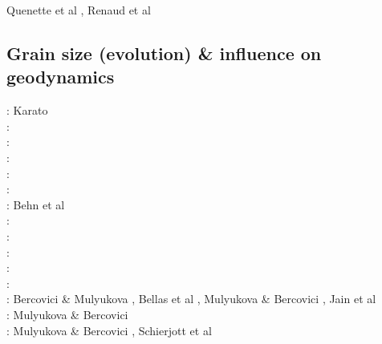 \begin{scriptsize}
Quenette et al \cite{quxm15}, Renaud et al \cite{revf19}
\end{scriptsize}

\subsection{Grain size (evolution) \& influence on geodynamics}
\label{sec:topics:gsev}

\begin{scriptsize}
\nineteeneightyfour: Karato \cite{kara84}\\
\nineteeneightynine: \cite{brcp99}\\
\twothousandone: \cite{dets01}\cite{solo01}\\
\twothousandtwo: \cite{soet02}\\
\twothousandthree: \cite{hapa03}\cite{reyu03}\\
\twothousandeight: \cite{sore08}\\
\twothousandnine: Behn et al \cite{behe09}\\
\twothousandeleven: \cite{rorb11}\\
\twothousandthirteen: \cite{beri13}\\
\twothousandfourteen: \cite{besr14}\\
\twothousandfifteen: \cite{thrk15}\cite{tukb15}\cite{pevp15}\cite{glfa15}\\
\twothousandseventeen: \cite{ceww17}\cite{daef17}\cite{mube17}\cite{scdu17}\\
\twothousandeighteen: Bercovici \& Mulyukova \cite{bemu18}, Bellas et al \cite{bezb18},
                      Mulyukova \& Bercovici \cite{mube18}, Jain et al \cite{jakk18}\\
\twothousandnineteen: Mulyukova \& Bercovici \cite{mube19}\\
\twothousandtwenty: Mulyukova \& Bercovici \cite{mube20}, Schierjott et al \cite{scrt20}
\end{scriptsize}

